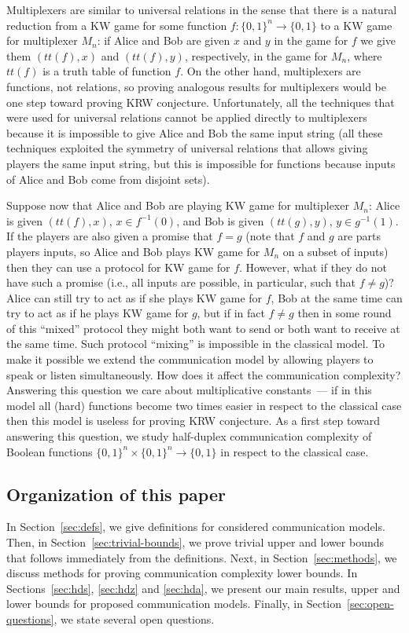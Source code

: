 Multiplexers are similar to universal relations in the sense that there is a natural reduction 
from a KW game for some function $f:\{0,1\}^n\to\{0,1\}$ to a KW game for multiplexer $M_n$: if Alice and Bob are given $x$ and $y$ in the game for $f$ we give them $(tt(f), x)$ 
and $(tt(f),y)$, respectively, in the game for $M_n$, where $tt(f)$ is a truth table of function $f$. 
On the other hand, multiplexers are functions, not relations, so proving analogous
results for multiplexers would be one step toward proving KRW conjecture.
Unfortunately, all the techniques that were used for universal relations cannot be applied directly 
to multiplexers because it is impossible to give Alice and Bob the same input string
(all these techniques exploited the symmetry of universal relations that allows giving players the same input string, but this is impossible for functions because inputs of Alice and Bob come from disjoint sets).

Suppose now that Alice and Bob are playing KW game for multiplexer $M_n$: Alice is
given $(tt(f), x)$, $x\in f^{-1}(0)$, and Bob is given $(tt(g), y)$, $y\in g^{-1}(1)$. If the
players are also given a promise that $f=g$ (note that $f$ and $g$ are parts players inputs, so Alice and Bob plays KW game for $M_n$ on a subset of inputs) then they can use a protocol for KW 
game for $f$. 
However, what if they do not have such a promise (i.e., all inputs are possible, in particular, such that $f\neq g$)?
Alice can still try to act as if she plays KW game for $f$, 
Bob at the same time can try to act as if he plays KW game for $g$,
but if in fact $f\neq g$ then in some round of this ``mixed'' protocol they might
both want to send or both want to receive at the same time.  
Such protocol ``mixing'' is impossible in the classical model. 
To make it possible we extend the communication model by allowing players to speak or listen simultaneously. How does it affect the communication complexity? Answering this question we care about multiplicative constants~--- 
if in this model all (hard) functions become two times easier in respect to the classical case then this model is useless for proving KRW conjecture.
As a first step toward answering this question, we study half-duplex communication complexity of Boolean functions $\{0,1\}^n\times\{0,1\}^n\to \{0,1\}$ in respect to the classical case. 

\subsection{Organization of this paper}
In Section~\ref{sec:defs}, we give definitions for considered communication models. Then, in Section~\ref{sec:trivial-bounds}, we prove trivial upper and lower bounds that follows immediately from the definitions. Next, in Section~\ref{sec:methods}, we discuss methods for proving communication complexity lower bounds. In Sections~\ref{sec:hds}, \ref{sec:hdz} and \ref{sec:hda}, we present our main results, upper and lower bounds for proposed communication models. Finally, in Section~\ref{sec:open-questions}, we state several open questions.


